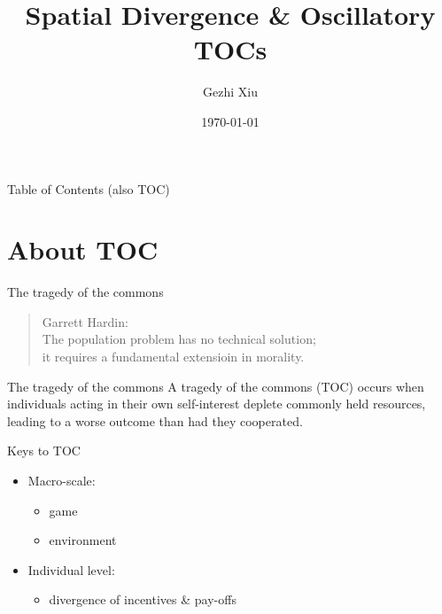 \documentclass{beamer}
\title{Spatial Divergence \& Oscillatory TOCs}
\author{Gezhi Xiu}
\date{\today}
\institute{IRSGIS\\Peking U}
\begin{document}
    
\maketitle

\begin{frame}{Table of Contents (also TOC)}
    \tableofcontents    
\end{frame}

\section{About TOC}

\begin{frame}{The tragedy of the commons}
    \begin{quote}{Garrett Hardin:}
        \vspace{0.5cm}
\\        The population problem has no technical solution;\\
        it requires a fundamental extensioin in morality.
    \end{quote}
\end{frame}

\begin{frame}{The tragedy of the commons}
    A tragedy of the commons (TOC) occurs when individuals acting in their own self-interest deplete commonly held resources, leading to a worse outcome than had they cooperated.
\end{frame}

\begin{frame}{Keys to TOC}
    \begin{itemize}
        \item Macro-scale: 
        \begin{itemize}
            \item game
            \item environment
        \end{itemize}
        \item Individual level:
        \begin{itemize}
            \item divergence of incentives \& pay-offs
        \end{itemize}
    \end{itemize}
\end{frame}
\end{document}
